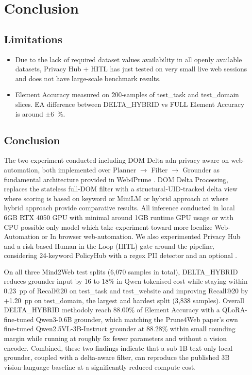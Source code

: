 \section{Conclusion}

\subsection{Limitations}

\begin{itemize}
    \item Due to the lack of required dataset values availability in all openly available datasets, Privacy Hub + HITL has just tested on very small live web sessions and does not have large-scale benchmark results.
    \item Element Accuracy measured on 200-samples of test\_task and test\_domain slices. EA difference between DELTA\_HYBRID vs FULL Element Accuracy is around $\pm$6~\%.
\end{itemize}

\subsection{Conclusion}
The two experiment conducted including DOM Delta adn privacy aware on web-automation, both implemented over Planner $\to$ Filter $\to$ Grounder as fundamental architecture provided in Web4Prune \cite{zhang2025prune4web}. DOM Delta Processing, replaces the stateless full-DOM filter with a structural-UID-tracked delta view where scoring is based on keyword or MiniLM \cite{wang2020minilm} or hybrid approach at where hybrid approach provide comparative results. All inference conducted in local 6GB RTX 4050 GPU with minimal around 1GB runtime GPU usage or with CPU possible only model which take experiment toward more localize Web-Automation or In browser web-automation. We also experimented Privacy Hub and a risk-based Human-in-the-Loop (HITL) gate around the pipeline, considering 24-keyword PolicyHub with a regex PII detector and an optional \cite{dettmers2023qlora}.

On all three Mind2Web \cite{deng2023mind2webgeneralistagentweb} test splits (6,070 samples in total), DELTA\_HYBRID reduces grounder input by 16 to 18\% in Qwen-tokenised cost while staying within 0.23~pp of Recall@20 on test\_task and test\_website and improving Recall@20 by +1.20~pp on test\_domain, the largest and hardest split (3,838 samples). Overall DELTA\_HYBRID methodoly reach 88.00\% of Element Accuracy with a QLoRA-fine-tuned Qwen3-0.6B grounder, which matching the Prune4Web paper's own fine-tuned Qwen2.5VL-3B-Instruct grounder at 88.28\% within small rounding margin while running at roughly 5x fewer parameters and without a vision encoder. Combined, these two findings indicate that a sub-1B text-only local grounder, coupled with a delta-aware filter, can reproduce the published 3B vision-language baseline at a significantly reduced compute cost.

